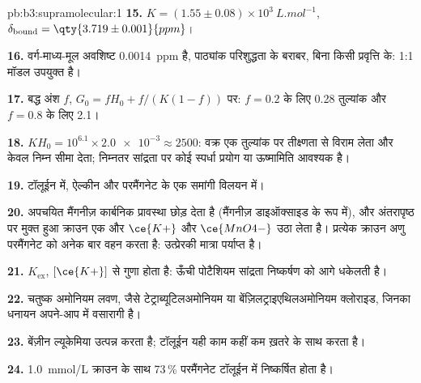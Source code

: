 \begin{solution}{pb:b3:supramolecular:1}
\textbf{15.} $K = (1.55 \pm 0.08) \times 10^3\ \unit{L.mol^{-1}}$, $\delta_{\mathrm{bound}} = \qty{3.719 \pm 0.001}{ppm}$।

\textbf{16.} वर्ग-माध्य-मूल अवशिष्ट \qty{0.0014}{ppm} है, पाठ्यांक
परिशुद्धता के बराबर, बिना किसी प्रवृत्ति के: 1:1 मॉडल उपयुक्त है।

\textbf{17.} बद्ध अंश $f$, $G_0 = fH_0 + f/(K(1 - f))$ पर: $f = 0.2$ के लिए 0.28 तुल्यांक और $f = 0.8$ के लिए 2.1।

\textbf{18.} $KH_0 = 10^{6.1} \times \num{2.0e-3} \approx 2500$: वक्र एक तुल्यांक पर तीक्ष्णता से विराम लेता
और केवल निम्न सीमा देता; निम्नतर सांद्रता पर कोई स्पर्धा प्रयोग या ऊष्मामिति
आवश्यक है।

\textbf{19.} टॉलूईन में, ऐल्कीन और परमैंगनेट के एक समांगी विलयन में।

\textbf{20.} अपचयित मैंगनीज़ कार्बनिक प्रावस्था छोड़ देता है (मैंगनीज़ डाइऑक्साइड के रूप में),
और अंतरापृष्ठ पर मुक्त हुआ क्राउन एक और $\ce{K+}$ और $\ce{MnO4-}$ उठा लेता है। प्रत्येक क्राउन
अणु परमैंगनेट को अनेक बार वहन करता है: उत्प्रेरकी मात्रा पर्याप्त है।

\textbf{21.} $K_{\mathrm{ex}}$, $[\ce{K+}]$ से गुणा होता है: ऊँची पोटैशियम सांद्रता निष्कर्षण को आगे धकेलती है।

\textbf{22.} चतुष्क अमोनियम लवण, जैसे टेट्राब्यूटिलअमोनियम या
बेंज़िलट्राइएथिलअमोनियम क्लोराइड, जिनका धनायन अपने-आप में वसारागी है।

\textbf{23.} बेंज़ीन ल्यूकेमिया उत्पन्न करता है; टॉलूईन यही काम कहीं कम
ख़तरे के साथ करता है।

\textbf{24.} \qty{1.0}{mmol/L} क्राउन के साथ 73\,\% परमैंगनेट
टॉलूईन में निष्कर्षित होता है।
\end{solution}
